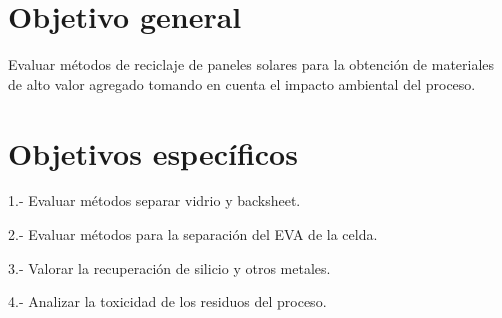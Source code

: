 \section{Objetivo general}
\label{sec:Objetivo general}

Evaluar métodos de reciclaje de paneles solares para la obtención de materiales de alto valor agregado tomando en cuenta el impacto ambiental del proceso. 

\section{Objetivos específicos}
\label{sec:Objetivos específicos}
1.- Evaluar métodos separar vidrio y backsheet. 

2.- Evaluar métodos para la separación del EVA de la celda.

3.- Valorar la recuperación de silicio y otros metales.

4.- Analizar la toxicidad de los residuos del proceso. 



